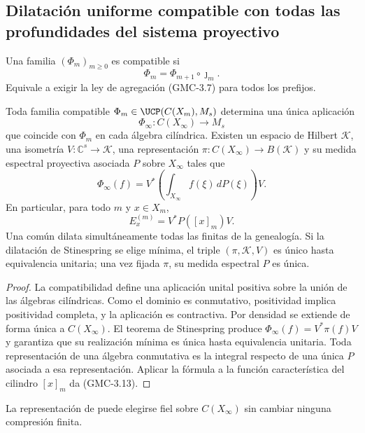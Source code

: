 \subsection{Dilatación uniforme compatible con todas las profundidades del sistema proyectivo}

Una familia $(\Phi_m)_{m\ge0}$ es compatible si
\[
 \Phi_m=\Phi_{m+1}\circ\jmath_m.
 \tag{GMC-3.10}
\]
Equivale a exigir la ley de agregación \textup{(GMC-3.7)} para todos los prefijos.

\begin{theorem}
\label{p12-83-c22-s4:gmc:thm:dilatacion-diagonal}
Toda familia compatible
$\Phi_m\in\UCP(C(X_m),M_s)$ determina una única aplicación
\[
 \Phi_\infty:C(X_\infty)\longrightarrow M_s
 \tag{GMC-3.11}
\]
que coincide con $\Phi_m$ en cada álgebra cilíndrica. Existen un espacio de
Hilbert $\mathcal K$, una isometría $V:\mathbb C^s\to\mathcal K$, una
representación $\pi:C(X_\infty)\to B(\mathcal K)$ y su medida espectral
proyectiva asociada $P$ sobre $X_\infty$ tales que
\[
 \Phi_\infty(f)=V^*\left(\int_{X_\infty}f(\xi)\,dP(\xi)\right)V.
 \tag{GMC-3.12}
\]
En particular, para todo $m$ y $x\in X_m$,
\[
 E_x^{(m)}=V^*P([x]_m)V.
 \tag{GMC-3.13}
\]
Una \PVM común dilata simultáneamente todas las \POVM finitas de la
genealogía. Si la dilatación de Stinespring se elige mínima, el triple
$(\pi,\mathcal K,V)$ es único hasta equivalencia unitaria; una vez fijada
$\pi$, su medida espectral $P$ es única.
\end{theorem}

\begin{proof}
La compatibilidad define una aplicación unital positiva sobre la unión de las
álgebras cilíndricas. Como el dominio es conmutativo, positividad implica
positividad completa, y la aplicación es contractiva. Por densidad se
extiende de forma única a $C(X_\infty)$. El teorema de Stinespring produce
$\Phi_\infty(f)=V^*\pi(f)V$ y garantiza que su realización mínima es única
hasta equivalencia unitaria. Toda representación de una álgebra conmutativa
es la integral respecto de una única \PVM $P$ asociada a esa representación.
Aplicar la fórmula a la función
característica del cilindro $[x]_m$ da \textup{(GMC-3.13)}.
\end{proof}

\begin{corollary}
La representación de  puede elegirse fiel sobre
$C(X_\infty)$ sin cambiar ninguna compresión finita.
\end{corollary}

